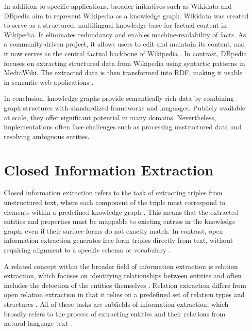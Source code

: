 \documentclass[a4paper,oneside,bibliography=totoc]{scrbook}
\begin{document}
In addition to specific applications, broader initiatives such as Wikidata and DBpedia aim to represent Wikipedia as a knowledge graph. Wikidata was created to serve as a structured, multilingual knowledge base for factual content in Wikipedia. It eliminates redundancy and enables machine-readability of facts. As a community-driven project, it allows users to edit and maintain its content, and it now serves as the central factual backbone of Wikipedia \cite{Vrandecic2014}. In contrast, DBpedia focuses on extracting structured data from Wikipedia using syntactic patterns in MediaWiki. The extracted data is then transformed into \ac{RDF}, making it usable in semantic web applications \cite{Auer2007}.

In conclusion, knowledge graphs provide semantically rich data by combining graph structures with standardized frameworks and languages. Publicly available at scale, they offer significant potential in many domains. Nevertheless, implementations often face challenges such as processing unstructured data and resolving ambiguous entities.


\section{Closed Information Extraction}
\label{sec:closed_information_extraction}

Closed information extraction refers to the task of extracting triples from unstructured text, where each component of the triple must correspond to elements within a predefined knowledge graph \cite{Josifoski2021}. This means that the extracted entities and properties must be mappable to existing entries in the knowledge graph, even if their surface forms do not exactly match. In contrast, open information extraction generates free-form triples directly from text, without requiring alignment to a specific schema or vocabulary \cite{Etzioni2008}.

A related concept within the broader field of information extraction is relation extraction, which focuses on identifying relationships between entities and often includes the detection of the entities themselves \cite{Zhao2024}. Relation extraction differs from open relation extraction in that it relies on a predefined set of relation types and structures \cite{Kamp2023}. All of these tasks are subfields of information extraction, which broadly refers to the process of extracting entities and their relations from natural language text \cite{Etzioni2008}.
\end{document}
